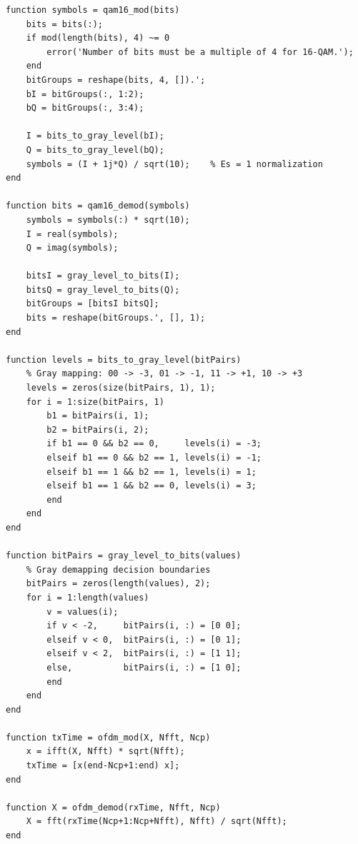\documentclass[a4paper]{article}
\begin{document}
\begin{lstlisting}[style=matlabstyle]
function symbols = qam16_mod(bits)
    bits = bits(:);
    if mod(length(bits), 4) ~= 0
        error('Number of bits must be a multiple of 4 for 16-QAM.');
    end
    bitGroups = reshape(bits, 4, []).';
    bI = bitGroups(:, 1:2);
    bQ = bitGroups(:, 3:4);

    I = bits_to_gray_level(bI);
    Q = bits_to_gray_level(bQ);
    symbols = (I + 1j*Q) / sqrt(10);    % Es = 1 normalization
end

function bits = qam16_demod(symbols)
    symbols = symbols(:) * sqrt(10);
    I = real(symbols);
    Q = imag(symbols);

    bitsI = gray_level_to_bits(I);
    bitsQ = gray_level_to_bits(Q);
    bitGroups = [bitsI bitsQ];
    bits = reshape(bitGroups.', [], 1);
end

function levels = bits_to_gray_level(bitPairs)
    % Gray mapping: 00 -> -3, 01 -> -1, 11 -> +1, 10 -> +3
    levels = zeros(size(bitPairs, 1), 1);
    for i = 1:size(bitPairs, 1)
        b1 = bitPairs(i, 1);
        b2 = bitPairs(i, 2);
        if b1 == 0 && b2 == 0,     levels(i) = -3;
        elseif b1 == 0 && b2 == 1, levels(i) = -1;
        elseif b1 == 1 && b2 == 1, levels(i) = 1;
        elseif b1 == 1 && b2 == 0, levels(i) = 3;
        end
    end
end

function bitPairs = gray_level_to_bits(values)
    % Gray demapping decision boundaries
    bitPairs = zeros(length(values), 2);
    for i = 1:length(values)
        v = values(i);
        if v < -2,     bitPairs(i, :) = [0 0];
        elseif v < 0,  bitPairs(i, :) = [0 1];
        elseif v < 2,  bitPairs(i, :) = [1 1];
        else,          bitPairs(i, :) = [1 0];
        end
    end
end

function txTime = ofdm_mod(X, Nfft, Ncp)
    x = ifft(X, Nfft) * sqrt(Nfft);
    txTime = [x(end-Ncp+1:end) x];
end

function X = ofdm_demod(rxTime, Nfft, Ncp)
    X = fft(rxTime(Ncp+1:Ncp+Nfft), Nfft) / sqrt(Nfft);
end
\end{lstlisting}
\end{document}
